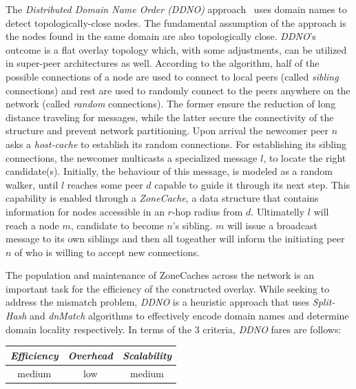 The \emph{Distributed Domain Name Order (DDNO)} approach~\cite{Z-YK2005} 
uses domain names to detect topologically-close nodes.
The fundamental assumption of the approach is the nodes found in 
the same domain are also topologically close.
\emph{DDNO}'s outcome is a flat overlay topology which, with some adjustments, 
can be utilized in super-peer architectures as well. According to the algorithm,
half of the possible connections of a node are used to connect to local peers
(called \emph{sibling} connections) and rest are used to randomly
connect to the peers anywhere on the network (called \emph{random} connections).
The former ensure the reduction of long distance traveling for messages, while
the latter secure the connectivity of the structure and prevent network
partitioning.
Upon arrival the newcomer peer $n$ asks a \emph{host-cache} to establish its
random connections. For establishing its sibling connections, the newcomer
multicasts a specialized message $l$, to locate the right candidate(s).
Initially, the behaviour of this message, is modeled as a random walker,
until $l$ reaches some peer $d$ capable to guide it through its next step.
This capability is enabled through a \emph{ZoneCache}, a data structure that
contains information for nodes accessible in an $r$-hop radius from $d$.
Ultimatelly $l$ will reach a node $m$, candidate to become $n$'s sibling. $m$
will issue a broadcast message to its own siblings and then all togeather will
inform the initiating peer $n$ of who is willing to accept new connections.

The population and maintenance of ZoneCaches across the network is an important
task for the efficiency of the constructed overlay. While seeking to address the
mismatch problem, \emph{DDNO} is a heuristic approach that uses
\emph{Split-Hash} and \emph{dnMatch} algorithms to effectively encode domain
names and determine domain locality respectively. In terms of the $3$ criteria,
\emph{DDNO} fares are follows:
\begin{center}
{\footnotesize
\begin{tabular}{ccc}
\emph{Efficiency} & \emph{Overhead} & \emph{Scalability} \\
\hline
medium &
low &
medium
\end{tabular}
}
\end{center}

